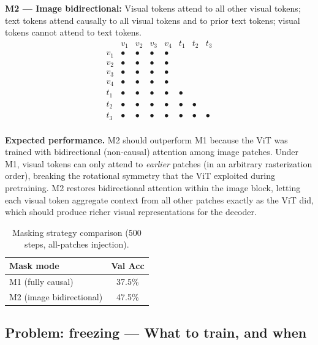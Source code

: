 \documentclass[11pt]{article}
\begin{document}
\medskip
\noindent\textbf{M2 --- Image bidirectional:}
Visual tokens attend to all other visual tokens; text tokens attend causally
to all visual tokens and to prior text tokens; visual tokens cannot attend
to text tokens.
\[
\begin{array}{c|ccccccc}
     & v_1 & v_2 & v_3 & v_4 & t_1 & t_2 & t_3 \\\hline
v_1  & \bullet & \bullet & \bullet & \bullet & & & \\
v_2  & \bullet & \bullet & \bullet & \bullet & & & \\
v_3  & \bullet & \bullet & \bullet & \bullet & & & \\
v_4  & \bullet & \bullet & \bullet & \bullet & & & \\
t_1  & \bullet & \bullet & \bullet & \bullet & \bullet & & \\
t_2  & \bullet & \bullet & \bullet & \bullet & \bullet & \bullet & \\
t_3  & \bullet & \bullet & \bullet & \bullet & \bullet & \bullet & \bullet \\
\end{array}
\]

\textbf{Expected performance.}
M2 should outperform M1 because the ViT was trained with bidirectional
(non-causal) attention among image patches. Under M1, visual tokens can
only attend to \emph{earlier} patches (in an arbitrary rasterization
order), breaking the rotational symmetry that the ViT exploited during
pretraining. M2 restores bidirectional attention within the image block,
letting each visual token aggregate context from all other patches exactly
as the ViT did, which should produce richer visual representations for the
decoder.

\begin{table}[H]
\centering
\caption{Masking strategy comparison (500 steps, all-patches injection).}
\begin{tabular}{lc}
\toprule
Mask mode & Val Acc \\
\midrule
M1 (fully causal)           & 37.5\% \\
M2 (image bidirectional)    & 47.5\% \\
\bottomrule
\end{tabular}
\end{table}

\subsection*{Problem: freezing --- What to train, and when}
\end{document}
